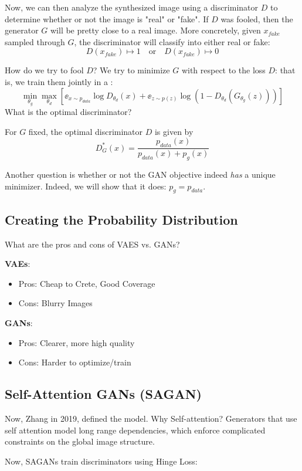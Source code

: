 \documentclass[11pt]{scrartcl}
\begin{document}
Now, we can then analyze the synthesized image using a discriminator $D$ to determine whether or not the image is "real" or "fake". If $D$ was fooled, then the generator $G$ will be pretty close to a real image. More concretely, given $x_{fake}$ sampled through $G$, the discriminator will classify into either real or fake: $$D(x_{fake}) \mapsto 1 \quad \text{or} \quad D(x_{fake}) \mapsto 0$$

How do we try to fool $D$? We try to minimize $G$ with respect to the loss $D$: that is, we train them jointly in a :
$$\min_{\theta_g}\max_{\theta_d}\left[\ee_{x \sim p_{data}}\log{D_\theta_{d}(x)}+\ee_{z \sim p(z)}\log(1-D_{\theta_d}(G_{\theta_g}(z)))\right]$$
What is the optimal discriminator? 
\begin{prop}
For $G$ fixed, the optimal discriminator $D$ is given by $$D^*_{G}(x)=\frac{p_{data}(x)}{p_{data}(x)+p_{g}(x)}$$
\end{prop}
Another question is whether or not the GAN objective indeed \textit{has} a unique minimizer. Indeed, we will show that it does: $p_{g}=p_{data}$.

\subsection{Creating the Probability Distribution}
What are the pros and cons of VAES vs. GANs?

\textbf{VAEs}:
\begin{itemize}
    \item Pros: Cheap to Crete, Good Coverage
    \item Cons: Blurry Images
\end{itemize}

\textbf{GANs}:
\begin{itemize}
    \item Pros: Clearer, more high quality
    \item Cons: Harder to optimize/train
\end{itemize}

\subsection{Self-Attention GANs (SAGAN)}
Now, Zhang in 2019, defined the  model. Why Self-attention? Generators that use self attention model long range dependencies, which enforce complicated constraints on the global image structure. 

Now, SAGANs train discriminators using Hinge Loss:
\end{document}
